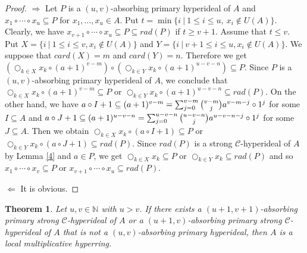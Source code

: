 \documentclass[preprint,review,10pt]{amsart}
\newtheorem{theorem}{Theorem}[section]
\theoremstyle{definition}
\theoremstyle{remark}
\numberwithin{equation}{section}
\begin{document}
\begin{proof}
$\Longrightarrow$ Let $P$ is a $(u,v)$-absorbing primary  hyperideal of $A$ and $x_1 \circ \cdots \circ x_u \subseteq P$ for $x_1,\ldots, x_u \in A $. Put $t=\min \{i \ \vert \ 1 \leq i \leq u , \ x_i \notin U(A)\}$. Clearly, we have $x_{v+1} \circ \cdots \circ x_u \subseteq P \subseteq rad(P)$ if $t \geq v+1$. Assume that $t \leq v$. Put $X=\{i \ \vert \   1 \leq i \leq v, x_i \notin U(A)\}$ and $Y=\{i \ \vert \   v+1 \leq i \leq u, x_i \notin U(A)\}$. We suppose that $card(X)=m$ and $card(Y)=n$. Therefore we get $(\bigcirc_{k \in X}x_k \circ (a+1)^{v-m}) \circ (\bigcirc_{k \in Y}x_k \circ (a+1)^{u-v-n}) \subseteq P$. Since $P$ is a $(u,v)$-absorbing primary  hyperideal of $A$, we conclude that $\bigcirc_{k \in X}x_k \circ (a+1)^{v-m} \subseteq P$ or $ \bigcirc_{k \in Y}x_k \circ (a+1)^{u-v-n} \subseteq rad(P)$. On the other hand, we have  $a \circ I +1 \subseteq (a+1)^{v-m}=\sum_{j=0}^{v-m} \tbinom{v-m}{j}a^{v-m-j} \circ 1^j$ for some  $I \subseteq A$ and $a \circ J +1 \subseteq (a+1)^{u-v-n}=\sum_{j=0}^{u-v-n} \tbinom{u-v-n}{j}a^{u-v-n-j} \circ 1^j$ for some  $J \subseteq A$. Then we obtain $\bigcirc_{k \in X}x_k \circ (a \circ I+1) \subseteq P$ or $\bigcirc_{k \in Y}x_k \circ (a \circ J +1) \subseteq rad(P)$. Since $rad(P)$ is a strong $\mathcal{C}$-hyperideal of $A$ by Lemma \ref{4} and $a  \in P$, we get $\bigcirc_{k \in X}x_k  \subseteq P$ or $\bigcirc_{k \in Y}x_k \subseteq rad(P)$ and so $x_1 \circ \cdots \circ x_v \subseteq P$ or $x_{v+1} \circ \cdots \circ x_u \subseteq rad(P)$. 

$\Longleftarrow$ It is obvious.
\end{proof}
\begin{theorem} \label{6}
Let $u,v \in \mathbb{N}$ with $u >v$. If there exists a $(u+1,v+1)$-absorbing primary strong $\mathcal{C}$-hyperideal of $A$ or a $(u+1,v)$-absorbing primary strong $\mathcal{C}$-hyperideal of $A$ that is not a $(u,v)$-absorbing primary hyperideal, then $A$ is a local multiplicative hyperring.
\end{theorem}
\end{document}
